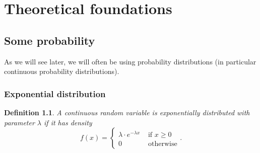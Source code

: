 \documentclass[letter]{report}
\newtheorem{definition}{Definition}[chapter]
\begin{document}
\newcommand{\leveltop}{0}
\newcommand{\leveltopI}{0}
\newcommand{\leveltopII}{0}
\newcommand{\leveltopIII}{0}
\newcommand{\leveltopIIII}{0}
\newcommand{\leveltopIIIII}{0}
\newcommand{\leveltopIIIIII}{0}
\newcommand{\leveltopIIIIIII}{0}
\newcommand{\leveltopIIIIIIII}{0}
\newcommand{\leveltopIIIIIIIII}{0}
\newcommand{\leveltopIIIIIIIIII}{0}
\newcommand{\leveltopIIIIIIIIIII}{0}
\newcommand{\leveltopIIIIIIIIIIII}{0}
\newcommand{\leveltopIIIIIIIIIIIII}{0}
\newcommand{\leveltopIIIIIIIIIIIIII}{0}
\newcommand{\leveltopIIIIIIIIIIIIIII}{0}
\newcommand{\leveltopIIIIIIIIIIIIIIII}{0}
\newcommand{\leveltopIIIIIIIIIIIIIIIII}{0}
\newcommand{\leveltopIIIIIIIIIIIIIIIIII}{0}
\newcommand{\leveltopIIIIIIIIIIIIIIIIIII}{0}
\newcommand{\leveltopIIIIIIIIIIIIIIIIIIII}{0}
\newcommand{\leveltopIIIIIIIIIIIIIIIIIIIII}{0}
\newcommand{\leveltopIIIIIIIIIIIIIIIIIIIIII}{0}
\newcommand{\leveltopIIIIIIIIIIIIIIIIIIIIIII}{0}
\newcommand{\leveltopIIIIIIIIIIIIIIIIIIIIIIII}{0}
\newcommand{\leveltopIIIIIIIIIIIIIIIIIIIIIIIII}{0}
\newcommand{\leveltopIIIIIIIIIIIIIIIIIIIIIIIIII}{0}
\newcommand{\leveltopIIIIIIIIIIIIIIIIIIIIIIIIIII}{0}
\newcommand{\leveltopIIIIIIIIIIIIIIIIIIIIIIIIIIII}{0}
\newcommand{\leveltopIIIIIIIIIIIIIIIIIIIIIIIIIIIII}{0}

\chapter{Theoretical foundations}
\label{chap:theoretical-foundations}

\section{Some probability}
\label{sec:some-probability}

As we will see later, we will often be using probability distributions (in particular continuous probability distributions).

\subsection{Exponential distribution}
\label{sec:exponential-distribution}

\begin{definition}
  A continuous random variable is \emph{exponentially distributed} with parameter $\lambda$ if it has density 
  \begin{equation*}
    f(x) =
    \begin{cases}
      \lambda \cdot e^{-\lambda x} & \text{ if } x \geq 0 
      \\ 0 & \text{ otherwise}
    \end{cases}
    .
  \end{equation*}
\end{definition}
\end{document}
